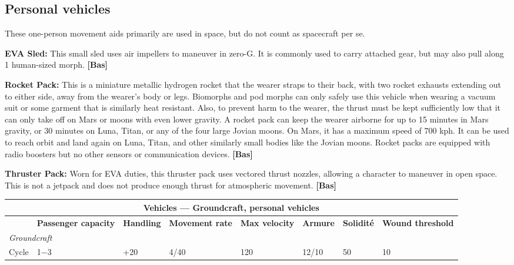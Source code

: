 {{\subsection{Personal vehicles} \label{sec:personal-vehicles} 

These one-person movement aids primarily are used in space, but do not count as spacecraft per se. 

\textbf{EVA Sled:} This small sled uses air impellers to maneuver in zero-G. It is commonly used to carry attached gear, but may also pull along 1 human-sized morph. \textbf{[Bas]} 

\textbf{Rocket Pack:} This is a miniature metallic hydrogen rocket that the wearer straps to their back, with two rocket exhausts extending out to either side, away from the wearer’s body or legs. Biomorphs and pod morphs can only safely use this vehicle when wearing a vacuum suit or some garment that is similarly heat resistant. Also, to prevent harm to the wearer, the thrust must be kept sufficiently low that it can only take off on Mars or moons with even lower gravity. A rocket pack can keep the wearer airborne for up to 15 minutes in Mars gravity, or 30 minutes on Luna, Titan, or any of the four large Jovian moons. On Mars, it has a maximum speed of 700 kph. It can be used to reach orbit and land again on Luna, Titan, and other similarly small bodies like the Jovian moons. Rocket packs are equipped with radio boosters but no other sensors or communication devices. \textbf{[Bas]} 

\textbf{Thruster Pack:} Worn for EVA duties, this thruster pack uses vectored thrust nozzles, allowing a character to maneuver in open space. This is not a jetpack and does not produce enough thrust for atmospheric movement. \textbf{[Bas]} 

\begin{table} \begin{tabularx}{\textwidth}{|l|X|X|X|X|X|X|X|} \hline

\multicolumn{8}{|c|}{\textbf{Vehicles --- Groundcraft, personal vehicles}} \\ \hline

&\textbf{Passenger capacity}	&\textbf{Handling}	&\textbf{Movement rate}	&\textbf{Max velocity}	&\textbf{Armure}	&\textbf{Solidité}	&\textbf{Wound threshold} \\ \hline

\multicolumn{8}{|l|}{\emph{Groundcraft}} \\ \hline

Cycle	&1$-$3	&+20	&4/40	&120	&12/10	&50	&10 \\ \hline


\end{tabularx}
\end{table}}}
